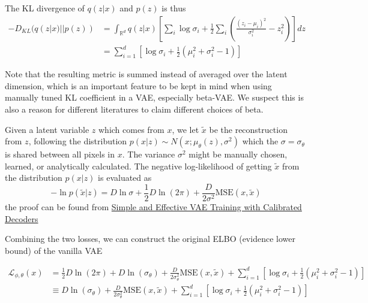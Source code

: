 \documentclass[12pt]{article}
\theoremstyle{remark}
\numberwithin{equation}{section}
\newcommand{\mse}{\text{MSE}}
\begin{document}
The KL divergence of $q(z|x)$ and $p(z)$ is thus 
\begin{align*}
    -D_{KL}(q(z|x)||p(z))&=
        \int_{\mathbb R^d}q(z|x)\left[
            \sum_i \log\sigma_i + \frac12\sum_i\left(
                \frac{(z_i-\mu_i)^2}{\sigma_i^2}-z_i^2
            \right)
        \right]dz\\
        &=\sum_{i=1}^d \left[
            \log\sigma_i + \frac12(\mu_i^2+\sigma_i^2-1)
        \right]
\end{align*}

Note that the resulting metric is summed instead of averaged over the 
latent dimension, which is an important feature to be kept in mind
when using manually tuned KL coefficient in a VAE, especially beta-VAE.
We suspect this is also a reason for different literatures to claim 
different choices of beta. 

Given a latent variable $z$ which comes from $x$, we let 
$\tilde x$ be the reconstruction from $z$, following the distribution
$p(x|z)\sim N(x; \mu_\theta(z), \sigma^2)$ which the $\sigma=\sigma_\theta$ is 
shared between all pixels in $x$. 
The variance $\sigma^2$ might be manually chosen, learned, or 
analytically calculated.  
The negative log-likelihood of getting $\tilde x$ from the distribution 
$p(x|z)$ is evaluated as $$-\ln p(\tilde x|z) = D\ln\sigma+\frac12D\ln(2\pi)
+ \frac D{2\sigma^2} \mse(x,\tilde x)$$ 
the proof can be found from 
\href{https://arxiv.org/pdf/2006.13202.pdf}{
Simple and Effective VAE Training with Calibrated Decoders}

Combining the two losses, we can construct the original ELBO 
(evidence lower bound) of the vanilla VAE


\begin{align*}
    \mathcal L_{\phi,\theta}(x)&= \frac12D \ln(2\pi) + D\ln(\sigma_\theta)
        + \frac{D}{2\sigma_\theta^2}\mse(x,\tilde x) + \sum_{i=1}^d \left[
            \log\sigma_i + \frac12(\mu_i^2+\sigma_i^2-1)
        \right]\\
        &\equiv D\ln(\sigma_\theta)
        + \frac{D}{2\sigma_\theta^2}\mse(x,\tilde x) + \sum_{i=1}^d \left[
            \log\sigma_i + \frac12(\mu_i^2+\sigma_i^2-1)\right]
\end{align*}
\end{document}
